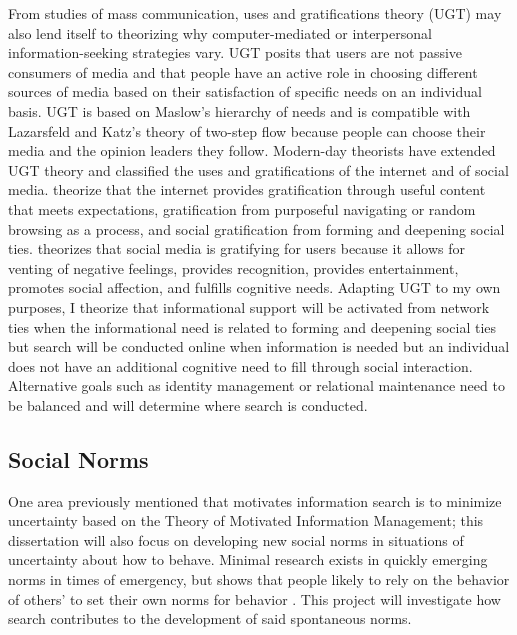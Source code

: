 From studies of mass communication, uses and gratifications theory (UGT)
\citep{blumlerUsesMassCommunications1974, tanMassCommunicationTheories1985}
may also lend itself to theorizing why
computer-mediated or interpersonal information-seeking strategies vary.
UGT posits that users are not passive consumers of media and that people
have an active role in choosing different sources of media based on
their satisfaction of specific needs on an individual basis. UGT is
based on Maslow's \citeyearpar{maslowTheoryHumanMotivation1943}
hierarchy of needs and is compatible with
Lazarsfeld and Katz's theory of two-step flow because people can choose
their media and the opinion leaders they follow. Modern-day theorists
have extended UGT theory and classified the uses and gratifications of
the internet and of social media. \citet{staffordDeterminingUsesGratifications2004}
theorize that the internet provides gratification through useful content
that meets expectations, gratification from purposeful navigating or
random browsing as a process, and social gratification from forming and
deepening social ties. \citet{leungGenerationalDifferencesContent2013} theorizes that 
social media is gratifying for users because it allows for venting of negative feelings,
provides recognition, provides entertainment, promotes social affection,
and fulfills cognitive needs. Adapting UGT to my own purposes, I
theorize that informational support will be activated from network ties
when the informational need is related to forming and deepening social
ties but search will be conducted online when information is needed but
an individual does not have an additional cognitive need to fill through
social interaction. Alternative goals such as identity management or
relational maintenance \citep{brashersInformationSeekingAvoiding2002}
need to be balanced and will determine where search is conducted.

\subsection{Social Norms}

One area previously mentioned that motivates information search is to
minimize uncertainty based on the Theory of Motivated Information
Management; this dissertation will also focus on developing new social
norms in situations of uncertainty about how to behave. Minimal research
exists in quickly emerging norms in times of emergency, but shows that
people likely to rely on the behavior of others' to set their own norms
for behavior \citep{alvarez2018, horneNormsIntegratedFramework2020}. 
This project will investigate how search contributes to the development of said spontaneous norms.

